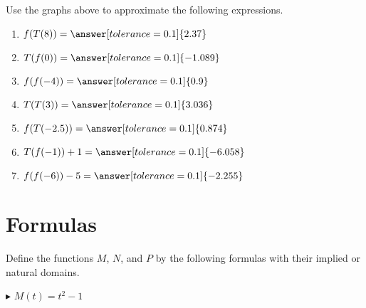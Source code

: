 \documentclass{ximera}
\begin{document}
\begin{question}


Use the graphs above to approximate the following expressions.



\begin{enumerate}

\item $f(T(8)) = \answer[tolerance=0.1]{2.37}$ \\

\item $T(f(0)) = \answer[tolerance=0.1]{-1.089}$ \\

\item $f(f(-4)) = \answer[tolerance=0.1]{0.9}$ \\

\item $T(T(3)) = \answer[tolerance=0.1]{3.036}$ \\

\item $f(T(-2.5)) = \answer[tolerance=0.1]{0.874}$ \\

\item $T(f(-1))+1 = \answer[tolerance=0.1]{-6.058}$ \\

\item $f(f(-6)) -5 = \answer[tolerance=0.1]{-2.255}$ \\

\end{enumerate}



\end{question}

















\section{Formulas}


Define the functions $M$, $N$, and $P$ by the following formulas with their implied or natural domains.

$\blacktriangleright$  $M(t) = t^2 - 1$ \\
\end{document}
